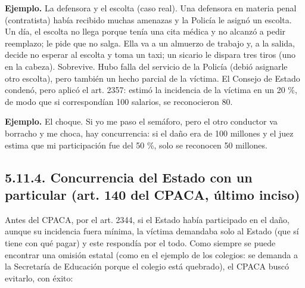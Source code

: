 \begin{ejemplo}
\textcolor[HTML]{4F6228}{\textbf{Ejemplo. }}La defensora y el escolta (caso real). Una defensora en materia penal (contratista) había recibido muchas amenazas y la Policía le asignó un escolta. Un día, el escolta no llega porque tenía una cita médica y no alcanzó a pedir reemplazo; le pide que no salga. Ella va a un almuerzo de trabajo y, a la salida, decide no esperar al escolta y toma un taxi; un sicario le dispara tres tiros (uno en la cabeza). Sobrevive. Hubo falla del servicio de la Policía (debió asignarle otro escolta), pero también un hecho parcial de la víctima. El Consejo de Estado condenó, pero aplicó el art. 2357: estimó la incidencia de la víctima en un 20 \%, de modo que si correspondían 100 salarios, se reconocieron 80.
\par
\textcolor[HTML]{4F6228}{\textbf{Ejemplo. }}El choque. Si yo me paso el semáforo, pero el otro conductor va borracho y me choca, hay concurrencia: si el daño era de 100 millones y el juez estima que mi participación fue del 50 \%, solo se reconocen 50 millones.
\end{ejemplo}
\subsection{5.11.4. Concurrencia del Estado con un particular (art. 140 del CPACA, último inciso)}
Antes del CPACA, por el art. 2344, si el Estado había participado en el daño, aunque su incidencia fuera mínima, la víctima demandaba solo al Estado (que sí tiene con qué pagar) y este respondía por el todo. Como siempre se puede encontrar una omisión estatal (como en el ejemplo de los colegios: se demanda a la Secretaría de Educación porque el colegio está quebrado), el CPACA buscó evitarlo, con éxito:

